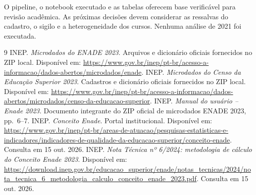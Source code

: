 \documentclass[12pt,a4paper]{article}
\begin{document}
O pipeline, o notebook executado e as tabelas oferecem base verificável para
revisão acadêmica. As próximas decisões devem considerar as ressalvas do cadastro,
o sigilo e a heterogeneidade dos cursos. Nenhuma análise de 2021 foi executada.

\clearpage
\begin{thebibliography}{9}
 INEP. \textit{Microdados do ENADE 2023}.
Arquivos e dicionário oficiais fornecidos no ZIP local. Disponível em:
\url{https://www.gov.br/inep/pt-br/acesso-a-informacao/dados-abertos/microdados/enade}.
 INEP. \textit{Microdados do Censo da Educação Superior 2023}.
Cadastros e dicionário oficiais fornecidos no ZIP local. Disponível em:
\url{https://www.gov.br/inep/pt-br/acesso-a-informacao/dados-abertos/microdados/censo-da-educacao-superior}.
 INEP. \textit{Manual do usuário -- Enade 2023}.
Documento integrante do ZIP oficial de microdados ENADE 2023, pp.~6--7.
 INEP. \textit{Conceito Enade}. Portal institucional.
Disponível em:
\url{https://www.gov.br/inep/pt-br/areas-de-atuacao/pesquisas-estatisticas-e-indicadores/indicadores-de-qualidade-da-educacao-superior/conceito-enade}.
Consulta em 15 out. 2026.
 INEP. \textit{Nota Técnica nº 6/2024: metodologia de
cálculo do Conceito Enade 2023}. Disponível em:
\url{https://download.inep.gov.br/educacao_superior/enade/notas_tecnicas/2024/nota_tecnica_6_metodologia_calculo_conceito_enade_2023.pdf}.
Consulta em 15 out. 2026.
\end{thebibliography}
\end{document}
